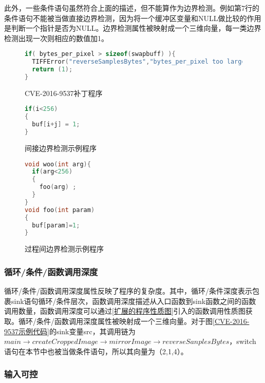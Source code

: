 {此外，一些条件语句虽然符合上面的描述，但不能算作为边界检测。例如第7行的条件语句不能被当做直接边界检测，因为将一个缓冲区变量和NULL做比较的作用是判断一个指针是否为NULL。边界检测属性被映射成一个三维向量，每一类边界检测出现一次则相应的数值加1。

\begin{figure}[h]
\begin{lstlisting}[language=C]
if( bytes_per_pixel > sizeof(swapbuff) ){
  TIFFError("reverseSamplesBytes","bytes_per_pixel too large");
  return (1);
}

\end{lstlisting}

\caption{CVE-2016-9537补丁程序}
\label{CVE-2016-9537补丁程序}
\end{figure}


\begin{figure}[h]
\begin{lstlisting}[language=C]
if(i<256)
{
  buf[i+j] = 1;
}
\end{lstlisting}

\caption{间接边界检测示例程序}
\label{间接边界检测示例程序}
\end{figure}


\begin{figure}[h]
\begin{lstlisting}[language=C,caption=过程间边界检测示例程序,label=过程间边界检测示例程序]
void woo(int arg){
  if(arg<256)
  {
    foo(arg) ;
  }
}
void foo(int param)
{
  buf[param]=1;
}
\end{lstlisting}

\caption{过程间边界检测示例程序}
\label{过程间边界检测示例程序}
\end{figure}



\subsubsection{循环/条件/函数调用深度}

循环/条件/函数调用深度属性反映了程序的复杂度。其中，循环/条件深度表示包裹sink语句循环/条件层次，函数调用深度描述从入口函数到sink函数之间的函数调用数量，函数调用深度可以通过\ref{扩展的程序性质图}引入的函数调用性质图获取。循环/条件/函数调用深度属性被映射成一个三维向量。对于图\ref{CVE-2016-9537示例代码}的sink变量src，其调用链为$main \rightarrow createCroppedImage \rightarrow mirrorImage \rightarrow reverseSanplesBytes$，switch语句在本节中也被当做条件语句，所以其向量为（2,1,4）。

\subsubsection{输入可控}

}
